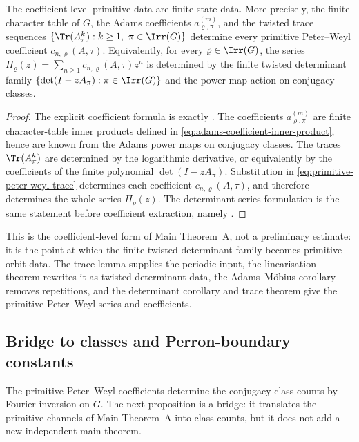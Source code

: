 \begin{corollary}
  \label{cor:primitive-peter-weyl-trace}
  The coefficient-level primitive data are finite-state data.  More
  precisely, the finite character table of \(G\), the Adams coefficients
  \(a_{\varrho,\pi}^{(m)}\), and the twisted trace sequences
  \(\{\Tr(A_\pi^k):k\ge1,\ \pi\in\Irr(G)\}\) determine every primitive
  Peter--Weyl coefficient \(c_{n,\varrho}(A,\tau)\). Equivalently, for
  every \(\varrho\in\Irr(G)\), the series \(\Pi_\varrho(z)
  =\sum_{n\ge1}c_{n,\varrho}(A,\tau)z^n\) is determined by the finite
  twisted determinant family \(\{\det(I-zA_\pi):\pi\in\Irr(G)\}\) and the
  power-map action on conjugacy classes.
\end{corollary}

\begin{proof}
  The explicit coefficient formula is exactly
  .  The coefficients
  \(a_{\varrho,\pi}^{(m)}\) are finite character-table inner products
  defined in \eqref{eq:adams-coefficient-inner-product}, hence are known
  from the Adams power maps on conjugacy classes.  The traces
  \(\Tr(A_\pi^k)\) are determined by the logarithmic derivative, or
  equivalently by the coefficients of the finite polynomial
  \(\det(I-zA_\pi)\). Substitution in
  \eqref{eq:primitive-peter-weyl-trace} determines each coefficient
  \(c_{n,\varrho}(A,\tau)\), and therefore determines the whole series
  \(\Pi_\varrho(z)\). The determinant-series formulation is the same
  statement before coefficient extraction, namely
  .
\end{proof}

\noindent
This is the coefficient-level form of Main Theorem~A, not a preliminary
estimate: it is the point at which the finite twisted determinant family
becomes primitive orbit data. The trace lemma supplies the periodic
input, the linearisation theorem rewrites it as twisted determinant data,
the Adams--M\"obius corollary removes repetitions, and the determinant
corollary and trace theorem give the primitive Peter--Weyl series and
coefficients.

\subsection{Bridge to classes and Perron-boundary constants}

The primitive Peter--Weyl coefficients determine the conjugacy-class
counts by Fourier inversion on \(G\). The next proposition is a bridge: it
translates the primitive channels of Main Theorem~A into class counts,
but it does not add a new independent main theorem.

